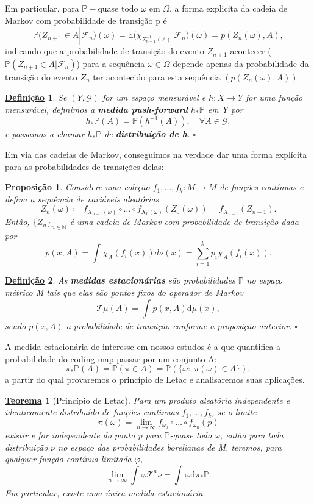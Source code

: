 \documentclass[12pt]{article}
\newtheorem*{def*}{\underline{Definição}}
\newtheorem*{theorem*}{\underline{Teorema}}
\newtheorem*{prop*}{\underline{Proposição}}
\theoremstyle{definition}
\begin{document}
Em particular, para \(\mathbb{P}-\)quase todo \(\omega \) em \(\Omega \), a forma explicita da cadeia de Markov com probabilidade de transição p é
\[
	\mathbb{P}(Z_{n+1}\in A| \mathcal{F}_{n})(\omega  )= \mathbb{E}\bigl(\chi_{Z_{n+1}^{-1}(A)}| \mathcal{F}_{n}\bigr)(\omega ) = p(Z_{n}(\omega ), A),
\]
indicando que a probabilidade de transição do evento \(Z_{n+1}\) acontecer (\(\mathbb{P}(Z_{n+1}\in A| \mathcal{F}_{n})\)) para a sequência \(\omega \in \Omega \) depende apenas da probabilidade da transição do evento \(Z_{n}\) ter acontecido para esta sequência \((p(Z_{n}(\omega ), A))\).

\begin{def*}
	Se \((Y, \mathcal{G})\) for um espaço mensurável e \(h:X\rightarrow Y\) for uma função mensurável, definimos a \textbf{medida push-forward} \(h_*\mathbb{P}\) em Y por
	\[
		h_*\mathbb{P}(A) = \mathbb{P}(h^{-1}(A)), \quad \forall A\in \mathcal{G},
	\]
	e passamos a chamar \(h_*\mathbb{P}\) de \textbf{distribuição de h}. \(\square\)
\end{def*}

Em via das cadeias de Markov, conseguimos na verdade dar uma forma explícita para as probabilidades de transições delas:
\begin{prop*}
	Considere uma coleção \(f_1,\dotsc , f_{k}:M\rightarrow M\) de funções contínuas e defina a sequência de variáveis aleatórias
	\[
		Z_{n}(\omega )\coloneqq f_{X_{n-1}(\omega )}\circ \dotsc \circ f_{X_{0}(\omega )}(Z_{0}(\omega )) = f_{X_{n-1}}(Z_{n-1}).
	\]
	Então, \(\{Z_{n}\}_{n\in \mathbb{N}}\) é uma cadeia de Markov com probabilidade de transição dada por
	\[
		p(x, A)=\int_{}\chi_{A}(f_{i}(x)) d\nu_{}(x)=\sum\limits_{i=1}^{k}p_{i}\chi_{A}(f_{i}(x)).
	\]
\end{prop*}

\begin{def*}
	As \textbf{medidas estacionárias} são probabilidades \(\mathbb{P}\) no espaço métrico M tais que elas são pontos fixos do operador de Markov
	\[
		\mathcal{T}\mu (A) = \int_{}^{}p(x, A) \mathrm{d}\mu(x),
	\]
	sendo \(p(x,A)\) a probabilidade de transição conforme a proposição anterior. \(\square\)
\end{def*}
A medida estacionária de interesse em nossos estudos é a que quantifica a probabilidade do coding map passar por um conjunto A:
\[
	\pi_{*}\mathbb{P}(A) = \mathbb{P}(\pi \in A) = \mathbb{P}(\{\omega:\; \pi (\omega )\in A\}),
\]
a partir do qual provaremos o princípio de Letac e analisaremos suas aplicações.
\begin{theorem*}[Princípio de Letac]
	Para um produto aleatória independente e identicamente distribuído de funções contínuas \(f_1, \dotsc , f_{k}\), se o limite
	\[
		\pi (\omega ) = \lim_{n\to \infty}f_{\omega_{0}}\circ \dotsc \circ f_{\omega_{n}}(p)
	\]
	existir e for independente do ponto p para \(\mathbb{P}\)-quase todo \(\omega \), então para toda distribuição \(\nu \) no espaço das probabilidades borelianas de M, teremos, para qualquer função contínua limitada \(\varphi \),
	\[
		\lim_{n\to \infty} \int_{}^{}\varphi\mathcal{T}^{n}\nu= \int_{}^{}\varphi  \mathrm{d}\pi_{*}\mathbb{P}.
	\]
	Em particular, existe uma única medida estacionária.
\end{theorem*}
\end{document}

